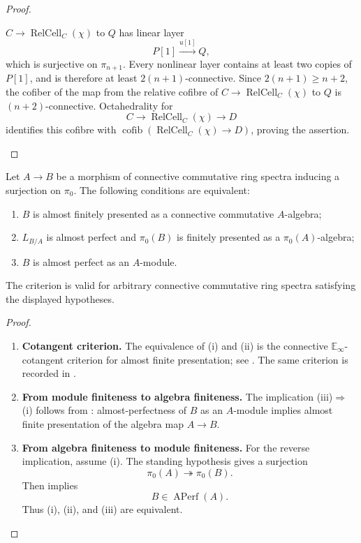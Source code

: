 \begin{proof}
\begin{enumerate}[label=\textup{(\arabic*)}]
    \(C\to\operatorname{RelCell}_C(\chi)\) to \(Q\) has
    linear layer
    \[
        P[1]\xrightarrow{u[1]}Q,
    \]
    which is surjective on \(\pi_{n+1}\). Every nonlinear layer contains at least
    two copies of \(P[1]\), and is therefore at least
    \(2(n+1)\)-connective. Since \(2(n+1)\geq n+2\), the cofiber of the map from
    the relative cofibre of \(C\to \operatorname{RelCell}_C(\chi)\) to \(Q\) is
    \((n+2)\)-connective. Octahedrality for
    \[
        C\longrightarrow \operatorname{RelCell}_C(\chi)\longrightarrow D
    \]
    identifies this cofibre with \(\operatorname{cofib}(\operatorname{RelCell}_C(\chi)\to D)\), proving
    the assertion.
\end{enumerate}
\end{proof}


\begin{theorem}
\label{thm:spectral-almost-finite-criterion}
Let \(A\to B\) be a morphism of connective commutative ring spectra inducing
a surjection on \(\pi_0\). The following conditions are equivalent:
\begin{enumerate}[label=(\roman*)]
    \item \(B\) is almost finitely presented as a connective commutative
    \(A\)-algebra;
    \item \(L_{B/A}\) is almost perfect and \(\pi_0(B)\) is finitely
    presented as a \(\pi_0(A)\)-algebra;
    \item \(B\) is almost perfect as an \(A\)-module.
\end{enumerate}
The criterion is valid for arbitrary connective commutative ring spectra satisfying
the displayed hypotheses.
\end{theorem}

\begin{proof}
\leavevmode
\begin{enumerate}[label=\textup{(\arabic*)}]
    \item \textbf{Cotangent criterion.}
    The equivalence of \textup{(i)} and \textup{(ii)} is the connective
    \(\mathbb E_\infty\)-cotangent criterion for almost finite presentation;
    see \cite[Theorem~2.12(2)]{LurieDAGIV}. The same criterion is recorded in
    \cite[Proposition~A.19(1)--(2)]{BrantnerMagidsonNuiten}.
    \item \textbf{From module finiteness to algebra finiteness.}
    The implication \textup{(iii)}\(\Rightarrow\)\textup{(i)} follows from
    \cite[Proposition~A.19(3)]{BrantnerMagidsonNuiten}: almost-perfectness of
    \(B\) as an \(A\)-module implies almost finite presentation of the algebra
    map \(A\to B\).
    \item \textbf{From algebra finiteness to module finiteness.}
    For the reverse implication, assume \textup{(i)}. The standing hypothesis
    gives a surjection
    \[
        \pi_0(A)\twoheadrightarrow\pi_0(B).
    \]
    Then \cite[Proposition~A.19(4)]{BrantnerMagidsonNuiten} implies
    \[
        B\in\operatorname{APerf}(A).
    \]
    Thus \textup{(i)}, \textup{(ii)}, and \textup{(iii)} are equivalent.
\end{enumerate}
\end{proof}

